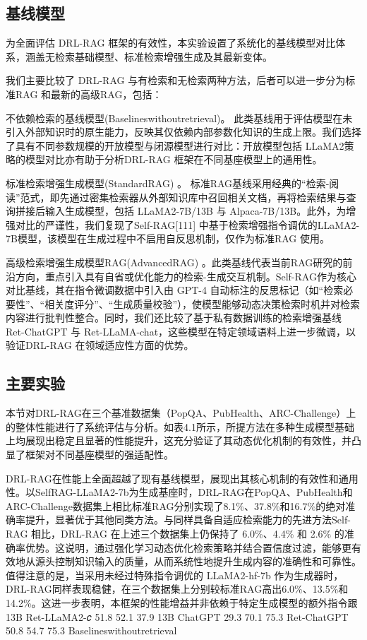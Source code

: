 \documentclass[12pt,a4paper,openright,UTF8]{ctexbook}
\begin{document}
\subsection{基线模型}

为全面评估 DRL-RAG 框架的有效性，本实验设置了系统化的基线模型对比体系，涵盖无检索基础模型、标准检索增强生成及其最新变体。


我们主要比较了 DRL-RAG 与有检索和无检索两种方法，后者可以进一步分为标准RAG 和最新的高级RAG，包括：


不依赖检索的基线模型(Baselineswithoutretrieval)。 此类基线用于评估模型在未引入外部知识时的原生能力，反映其仅依赖内部参数化知识的生成上限。我们选择了具有不同参数规模的开放模型与闭源模型进行对比：开放模型包括 LLaMA2策略的模型对比亦有助于分析DRL-RAG 框架在不同基座模型上的通用性。


标准检索增强生成模型(StandardRAG) 。 标准RAG基线采用经典的“检索-阅读”范式，即先通过密集检索器从外部知识库中召回相关文档，再将检索结果与查询拼接后输入生成模型，包括 LLaMA2-7B/13B 与 Alpaca-7B/13B。此外，为增强对比的严谨性，我们复现了Self-RAG[111] 中基于检索增强指令调优的LLaMA2-7B模型，该模型在生成过程中不启用自反思机制，仅作为标准RAG 使用。


高级检索增强生成模型RAG(AdvancedRAG) 。此类基线代表当前RAG研究的前沿方向，重点引入具有自省或优化能力的检索-生成交互机制。Self-RAG作为核心对比基线，其在指令微调数据中引入由 GPT-4 自动标注的反思标记（如“检索必要性”、“相关度评分”、“生成质量校验”），使模型能够动态决策检索时机并对检索内容进行批判性整合。同时，我们还比较了基于私有数据训练的检索增强基线 Ret-ChatGPT 与 Ret-LLaMA-chat，这些模型在特定领域语料上进一步微调，以验证DRL-RAG 在领域适应性方面的优势。

\subsection{主要实验}

本节对DRL-RAG在三个基准数据集（PopQA、PubHealth、ARC-Challenge）上的整体性能进行了系统评估与分析。如表4.1所示，所提方法在多种生成模型基础上均展现出稳定且显著的性能提升，这充分验证了其动态优化机制的有效性，并凸显了框架对不同基座模型的强适配性。


DRL-RAG在性能上全面超越了现有基线模型，展现出其核心机制的有效性和通用性。以SelfRAG-LLaMA2-7b为生成基座时，DRL-RAG在PopQA、PubHealth和ARC-Challenge数据集上相比标准RAG分别实现了8.1\%、37.8\%和16.7\%的绝对准确率提升，显著优于其他同类方法。与同样具备自适应检索能力的先进方法Self-RAG 相比，DRL-RAG 在上述三个数据集上仍保持了 6.0\%、4.4\% 和 2.6\% 的准确率优势。这说明，通过强化学习动态优化检索策略并结合置信度过滤，能够更有效地从源头控制知识输入的质量，从而系统性地提升生成内容的准确性和可靠性。值得注意的是，当采用未经过特殊指令调优的 LLaMA2-hf-7b 作为生成器时，DRL-RAG同样表现稳健，在三个数据集上分别较标准RAG高出6.0\%、13.5\%和14.2\%。这进一步表明，本框架的性能增益并非依赖于特定生成模型的额外指令跟13B Ret-LLaMA2-𝑐 51.8 52.1 37.9 13B ChatGPT 29.3 70.1 75.3 Ret-ChatGPT 50.8 54.7 75.3 Baselineswithoutretrieval
\end{document}
